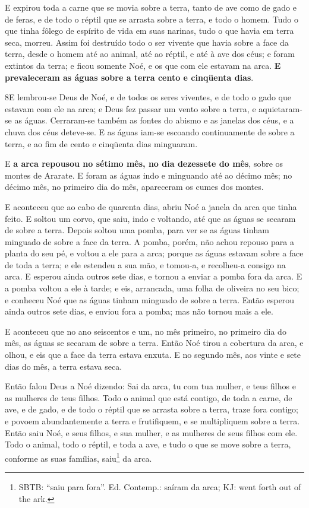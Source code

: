 E expirou toda a carne que se movia sobre a terra, tanto de ave
como de gado e de feras, e de todo o réptil que se arrasta sobre a
terra, e todo o homem. Tudo o que tinha fôlego de espírito de
vida em suas narinas, tudo o que havia em terra seca, morreu.
Assim foi destruído todo o ser vivente que havia sobre a face
da terra, desde o homem até ao animal, até ao réptil, e até à ave
dos céus; e foram extintos da terra; e ficou somente Noé, e os que
com ele estavam na arca. \textbf{E prevaleceram as águas
sobre a terra cento e cinqüenta dias}.

\smallskip

\lettrine{8} E lembrou-se Deus de Noé, e de todos os seres
viventes, e de todo o gado que estavam com ele na arca; e Deus fez
passar um vento sobre a terra, e aquietaram-se as águas.
Cerraram-se também as fontes do abismo e as janelas dos céus, e
a chuva dos céus deteve-se. E as águas iam-se escoando
continuamente de sobre a terra, e ao fim de cento e cinqüenta dias
minguaram.

E \textbf{a arca repousou no sétimo mês, no dia dezessete do mês},
sobre os montes de Ararate. E foram as águas indo e minguando
até ao décimo mês; no décimo mês, no primeiro dia do mês, apareceram
os cumes dos montes.

E aconteceu que ao cabo de quarenta dias, abriu Noé a janela da
arca que tinha feito. E soltou um corvo, que saiu, indo e
voltando, até que as águas se secaram de sobre a terra. Depois
soltou uma pomba, para ver se as águas tinham minguado de sobre a
face da terra. A pomba, porém, não achou repouso para a planta
do seu pé, e voltou a ele para a arca; porque as águas estavam sobre
a face de toda a terra; e ele estendeu a sua mão, e tomou-a, e
recolheu-a consigo na arca. E esperou ainda outros sete dias,
e tornou a enviar a pomba fora da arca. E a pomba voltou a
ele à tarde; e eis, arrancada, uma folha de oliveira no seu bico; e
conheceu Noé que as águas tinham minguado de sobre a terra.
Então esperou ainda outros sete dias, e enviou fora a pomba;
mas não tornou mais a ele.

E aconteceu que no ano seiscentos e um, no mês primeiro, no
primeiro dia do mês, as águas se secaram de sobre a terra. Então Noé
tirou a cobertura da arca, e olhou, e eis que a face da terra estava
enxuta. E no segundo mês, aos vinte e sete dias do mês, a
terra estava seca.

Então falou Deus a Noé dizendo: Sai da arca, tu com tua
mulher, e teus filhos e as mulheres de teus filhos. Todo o
animal que está contigo, de toda a carne, de ave, e de gado, e de
todo o réptil que se arrasta sobre a terra, traze fora contigo; e
povoem abundantemente a terra e frutifiquem, e se multipliquem sobre
a terra. Então saiu Noé, e seus filhos, e sua mulher, e as
mulheres de seus filhos com ele. Todo o animal, todo o
réptil, e toda a ave, e tudo o que se move sobre a terra, conforme
as suas famílias, saiu\footnote{SBTB: ``saiu para fora''. Ed.
Contemp.: saíram da arca; KJ: went forth out of the ark.} da arca.

